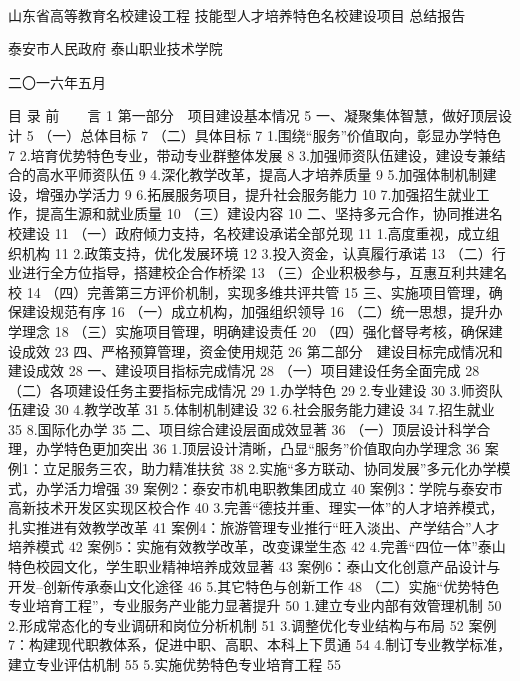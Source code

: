 　　　　　　　　　　　　　　　　　　　　　　　　　　　




山东省高等教育名校建设工程
技能型人才培养特色名校建设项目
总结报告









泰安市人民政府
泰山职业技术学院

二〇一六年五月

目   录
前　　言	1
第一部分　项目建设基本情况	5
一、凝聚集体智慧，做好顶层设计	5
（一）总体目标	7
（二）具体目标	7
1.围绕“服务”价值取向，彰显办学特色	7
2.培育优势特色专业，带动专业群整体发展	8
3.加强师资队伍建设，建设专兼结合的高水平师资队伍	9
4.深化教学改革，提高人才培养质量	9
5.加强体制机制建设，增强办学活力	9
6.拓展服务项目，提升社会服务能力	10
7.加强招生就业工作，提高生源和就业质量	10
（三）建设内容	10
二、坚持多元合作，协同推进名校建设	11
（一）政府倾力支持，名校建设承诺全部兑现	11
1.高度重视，成立组织机构	11
2.政策支持，优化发展环境	12
3.投入资金，认真履行承诺	13
（二）行业进行全方位指导，搭建校企合作桥梁	13
（三）企业积极参与，互惠互利共建名校	14
（四）完善第三方评价机制，实现多维共评共管	15
三、实施项目管理，确保建设规范有序	16
（一）成立机构，加强组织领导	16
（二）统一思想，提升办学理念	18
（三）实施项目管理，明确建设责任	20
（四）强化督导考核，确保建设成效	23
四、严格预算管理，资金使用规范	26
第二部分　建设目标完成情况和建设成效	28
一、建设项目指标完成情况	28
（一）项目建设任务全面完成	28
（二）各项建设任务主要指标完成情况	29
1.办学特色	29
2.专业建设	30
3.师资队伍建设	30
4.教学改革	31
5.体制机制建设	32
6.社会服务能力建设	34
7.招生就业	35
8.国际化办学	35
二、项目综合建设层面成效显著	36
（一）顶层设计科学合理，办学特色更加突出	36
1.顶层设计清晰，凸显“服务”价值取向办学理念	36
案例1：立足服务三农，助力精准扶贫	38
2.实施“多方联动、协同发展”多元化办学模式，办学活力增强	39
案例2：泰安市机电职教集团成立	40
案例3：学院与泰安市高新技术开发区实现区校合作	40
3.完善“德技并重、理实一体”的人才培养模式，扎实推进有效教学改革	41
案例4：旅游管理专业推行“旺入淡出、产学结合”人才培养模式	42
案例5：实施有效教学改革，改变课堂生态	42
4.完善“四位一体”泰山特色校园文化，学生职业精神培养成效显著	43
案例6：泰山文化创意产品设计与开发--创新传承泰山文化途径	46
5.其它特色与创新工作	48
（二）实施“优势特色专业培育工程”，专业服务产业能力显著提升	50
1.建立专业内部有效管理机制	50
2.形成常态化的专业调研和岗位分析机制	51
3.调整优化专业结构与布局	52
案例7：构建现代职教体系，促进中职、高职、本科上下贯通	54
4.制订专业教学标准，建立专业评估机制	55
5.实施优势特色专业培育工程	55
